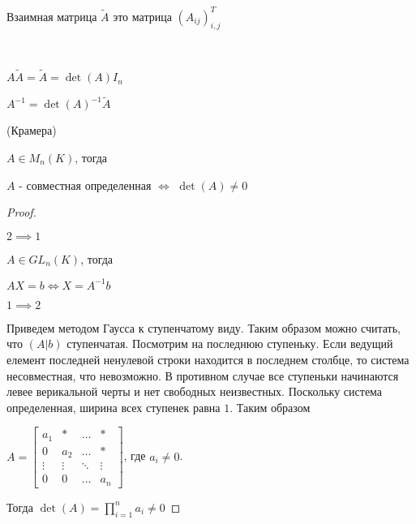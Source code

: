 \begin{defn}
    Взаимная матрица $\tilde{A}$ это матрица $(A_{ij})_{i,j}^T$
\end{defn}

\begin{follow}~

    $A\tilde{A} = \tilde{A} = \det(A) I_n$
    
    $A^{-1} = \det(A)^{-1}\tilde{A}$
\end{follow}

\begin{theorem}
    (Крамера)

    $A \in M_n(K)$, тогда
    
    $A$ - совместная определенная $\iff$ $\det(A) \neq 0$
\end{theorem}

\begin{proof}~

    $2 \implies 1$ 
    
    $A \in GL_n(K)$, тогда

    $AX = b \iff X = A^{-1}b$

    $1 \implies 2$

    Приведем методом Гаусса к ступенчатому виду. Таким образом можно считать, что $(A|b)$ ступенчатая.
    Посмотрим на последнюю ступеньку. Если ведущий елемент последней ненулевой строки находится в последнем столбце, то система несовместная, что невозможно.
    В противном случае все ступеньки начинаются левее верикальной черты и нет свободных неизвестных. Поскольку система определенная, ширина всех ступенек равна $1$.
    Таким образом 
    
    $A = \begin{bmatrix}
        a_1& * & \ldots & * \\
        0 & a_2 & \ldots & * \\
        \vdots & \vdots & \ddots & \vdots \\
        0 & 0 & \ldots & a_n
    \end{bmatrix}$, где $a_i \neq 0$. 
    
    Тогда $\det(A) = \prod\limits_{i = 1}^n a_i \neq 0$
\end{proof}